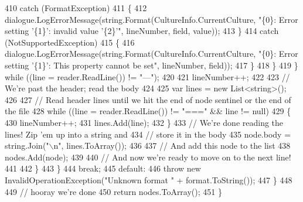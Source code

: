 \begin{DoxyCode}
410                                     \textcolor{keywordflow}{catch} (FormatException)
411                                     \{
412                                         dialogue.LogErrorMessage(string.Format(CultureInfo.CurrentCulture, \textcolor{stringliteral}{
      "\{0\}: Error setting '\{1\}': invalid value '\{2\}'"}, lineNumber, field, value));
413                                     \}
414                                     \textcolor{keywordflow}{catch} (NotSupportedException)
415                                     \{
416                                         dialogue.LogErrorMessage(string.Format(CultureInfo.CurrentCulture, \textcolor{stringliteral}{
      "\{0\}: Error setting '\{1\}': This property cannot be set"}, lineNumber, field));
417                                     \}
418                                 \}
419                             \} \textcolor{keywordflow}{while} ((line = reader.ReadLine()) != \textcolor{stringliteral}{"---"});
420 
421                             lineNumber++;
422 
423                             \textcolor{comment}{// We're past the header; read the body}
424 
425                             var lines = \textcolor{keyword}{new} List<string>();
426 
427                             \textcolor{comment}{// Read header lines until we hit the end of node sentinel or the end of the
       file}
428                             \textcolor{keywordflow}{while} ((line = reader.ReadLine()) != \textcolor{stringliteral}{"==="} && line != null)
429                             \{
430                                 lineNumber++;
431                                 lines.Add(line);
432                             \}
433                             \textcolor{comment}{// We're done reading the lines! Zip 'em up into a string and}
434                             \textcolor{comment}{// store it in the body}
435                             node.body = string.Join(\textcolor{stringliteral}{"\(\backslash\)n"}, lines.ToArray());
436 
437                             \textcolor{comment}{// And add this node to the list}
438                             nodes.Add(node);
439 
440                             \textcolor{comment}{// And now we're ready to move on to the next line!}
441 
442                         \}
443                     \}
444                     \textcolor{keywordflow}{break};
445                 \textcolor{keywordflow}{default}:
446                     \textcolor{keywordflow}{throw} \textcolor{keyword}{new} InvalidOperationException(\textcolor{stringliteral}{"Unknown format "} + format.ToString());
447             \}
448 
449             \textcolor{comment}{// hooray we're done}
450             \textcolor{keywordflow}{return} nodes.ToArray();
451         \}
\end{DoxyCode}
